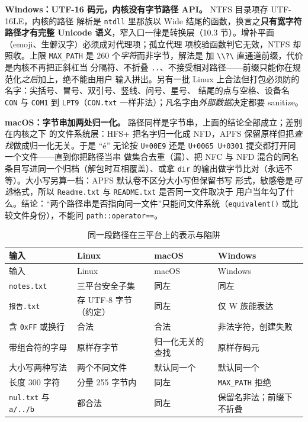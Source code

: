 \documentclass[12pt,a4paper,fontset=fandol]{ctexbook}
\newcommand{\Fn}[1]{\texttt{#1()}}
\newcommand{\Tp}[1]{\texttt{#1}}
\begin{document}
\textbf{Windows：UTF-16 码元，内核没有字节路径 API。} NTFS 目录项存 UTF-16LE，内核的路径
解析是 \Tp{ntdll} 里那族以 Wide 结尾的函数，换言之\textbf{只有宽字符路径才有完整 Unicode
语义}，窄入口一律是转换层（10.3 节）。增补平面（emoji、生僻汉字）必须成对代理项；孤立代理
项校验函数判它无效，NTFS 却照收。上限 \Tp{MAX\_PATH} 是 260 个\emph{字符}而非字节，解法是
加 \Tp{\textbackslash\textbackslash?\textbackslash} 直通道前缀，代价是内核不再把正斜杠当
分隔符、不折叠 \Tp{..}、不接受相对路径——前缀只能你在规范化\emph{之后}加上，绝不能由用户
输入拼出。另有一批 Linux 上合法但打包必须防的名字：尖括号、冒号、双引号、竖线、问号、星号、
结尾的点与空格、设备名 \Tp{CON} 与 \Tp{COM1} 到 \Tp{LPT9}（\Tp{CON.txt} 一样非法）；凡名字由\emph{外部数据}决定都要 sanitize。

\textbf{macOS：字节串加两处归一化。} 路径同样是字节串，上面的结论全部成立；差别在内核之下
的文件系统层：HFS+ 把名字归一化成 NFD，APFS 保留原样但把\emph{查找}做成归一化无关。于是
``é'' 无论按 \Tp{U+00E9} 还是 \Tp{U+0065 U+0301} 提交都打开同一个文件——直到你把路径当串
做集合去重（漏）、把 NFC 与 NFD 混合的同名条目写进同一个归档（解包时互相覆盖）、或拿
\Tp{dir} 的输出做字节比对（永远不等）。大小写另算一档：APFS 默认卷不区分大小写但保留书写
形式，敏感卷是\emph{可选}格式，所以 \Tp{Readme.txt} 与 \Tp{README.txt} 是否同一文件取决于
用户当年勾了什么。结论：``两个路径串是否指向同一文件''只能问文件系统（\Fn{equivalent} 或比较文件身份），不能问 \Tp{path::operator==}。

\begin{longtable}{@{}>{\raggedright\arraybackslash}p{}
                 >{\raggedright\arraybackslash}p{}
                 >{\raggedright\arraybackslash}p{}
                 >{\raggedright\arraybackslash}p{}@{}}
\caption{同一段路径在三平台上的表示与陷阱} \\
\toprule
输入 & Linux & macOS & Windows \\
\midrule
\endfirsthead
\toprule
输入 & Linux & macOS & Windows \\
\midrule
\endhead
\Tp{notes.txt} & 三平台安全子集 & 同左 & 同左 \\
\Tp{报告.txt} & 存 UTF-8 字节（约定） & 同左 & 仅 W 族能表达 \\
含 \Tp{0xFF} 或换行 & 合法 & 合法 & 非法字符，创建失败 \\
带组合符的字母 & 原样存字节 & 归一化无关的查找 & 原样存码元 \\
大小写两种写法 & 两个不同文件 & 默认同一个 & 默认同一个 \\
长度 300 字符 & 分量 255 字节内 & 同左 & \Tp{MAX\_PATH} 拒绝 \\
\Tp{nul.txt} 与 \Tp{a/../b} & 都合法 & 同左 & 保留名非法；前缀下不折叠 \\
\bottomrule
\end{longtable}
\end{document}
